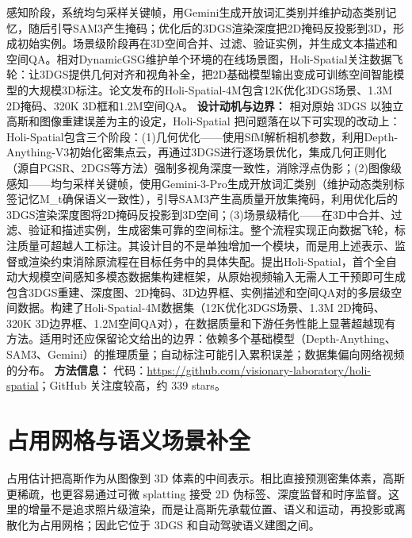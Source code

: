 感知阶段，系统均匀采样关键帧，用Gemini生成开放词汇类别并维护动态类别记忆，随后引导SAM3产生掩码；优化后的3DGS渲染深度把2D掩码反投影到3D，形成初始实例。场景级阶段再在3D空间合并、过滤、验证实例，并生成文本描述和空间QA。相对DynamicGSG维护单个环境的在线场景图，Holi-Spatial关注数据飞轮：让3DGS提供几何对齐和视角补全，把2D基础模型输出变成可训练空间智能模型的大规模3D标注。论文发布的Holi-Spatial-4M包含12K优化3DGS场景、1.3M 2D掩码、320K 3D框和1.2M空间QA。
\textbf{设计动机与边界：} 相对原始 3DGS 以独立高斯和图像重建误差为主的设定，Holi-Spatial 把问题落在以下可实现的改动上：Holi-Spatial包含三个阶段：(1)几何优化——使用SfM解析相机参数，利用Depth-Anything-V3初始化密集点云，再通过3DGS进行逐场景优化，集成几何正则化（源自PGSR、2DGS等方法）强制多视角深度一致性，消除浮点伪影；(2)图像级感知——均匀采样关键帧，使用Gemini-3-Pro生成开放词汇类别（维护动态类别标签记忆M\_t确保语义一致性），引导SAM3产生高质量开放集掩码，利用优化后的3DGS渲染深度图将2D掩码反投影到3D空间；(3)场景级精化——在3D中合并、过滤、验证和描述实例，生成密集可靠的空间标注。整个流程实现正向数据飞轮，标注质量可超越人工标注。其设计目的不是单独增加一个模块，而是用上述表示、监督或渲染约束消除原流程在目标任务中的具体失配。提出Holi-Spatial，首个全自动大规模空间感知多模态数据集构建框架，从原始视频输入无需人工干预即可生成包含3DGS重建、深度图、2D掩码、3D边界框、实例描述和空间QA对的多层级空间数据。构建了Holi-Spatial-4M数据集（12K优化3DGS场景、1.3M 2D掩码、320K 3D边界框、1.2M空间QA对），在数据质量和下游任务性能上显著超越现有方法。适用时还应保留论文给出的边界：依赖多个基础模型（Depth-Anything、SAM3、Gemini）的推理质量；自动标注可能引入累积误差；数据集偏向网络视频的分布。
\textbf{方法信息：} 代码：\url{https://github.com/visionary-laboratory/holi-spatial}；GitHub 关注度较高，约 339 stars。



\section{占用网格与语义场景补全}

占用估计把高斯作为从图像到 3D 体素的中间表示。相比直接预测密集体素，高斯更稀疏，也更容易通过可微 splatting 接受 2D 伪标签、深度监督和时序监督。这里的增量不是追求照片级渲染，而是让高斯先承载位置、语义和运动，再投影或离散化为占用网格；因此它位于 3DGS 和自动驾驶语义建图之间。


